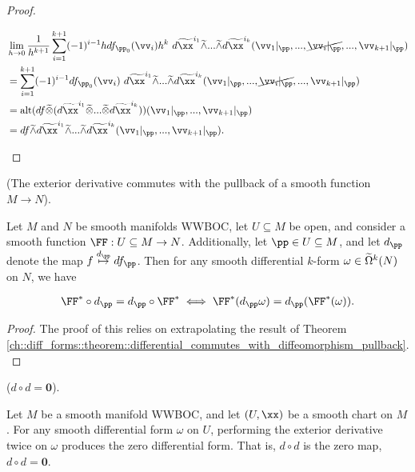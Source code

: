 \begin{proof}
\begin{enumerate}
        \begin{align*}
            &\lim_{h \rightarrow 0} \frac{1}{h^{k + 1}} \sum_{i = 1}^{k + 1} (-1)^{i - 1} h df_{\pp_0}(\vv_i) h^k \spc d\tx^{i_1} \twedge ... \twedge d\tx^{i_k}(\vv_1|_\pp, ..., \cancel{\vv_i|_\pp}, ..., \vv_{k + 1}|_\pp) \\
            &= \sum_{i = 1}^{k + 1} (-1)^{i - 1} df_{\pp_0}(\vv_i) \spc d\tx^{i_1} \twedge ... \twedge d\tx^{i_k}(\vv_1|_\pp, ..., \cancel{\vv_i|_\pp}, ..., \vv_{k + 1}|_\pp) \\
            &= \alt(df \totimes (d\tx^{i_1} \totimes ... \totimes d\tx^{i_k}))(\vv_1|_\pp, ..., \vv_{k + 1}|_\pp) \\
            &= df \twedge d\tx^{i_1} \twedge ... \twedge d\tx^{i_k}(\vv_1|_\pp, ..., \vv_{k + 1}|_\pp).
        \end{align*}
    \end{enumerate}
\end{proof}

\begin{theorem}
    \label{ch::exterior_pwrs::thm::exterior_derivative_commutes_with_pullback}
     (The exterior derivative commutes with the pullback of a smooth function $M \rightarrow N$).
    
    Let $M$ and $N$ be smooth manifolds WWBOC, let $U \subseteq M$ be open, and consider a smooth function $\FF:U \subseteq M \rightarrow N$. Additionally, let $\pp \in U \subseteq M$, and let $d_\pp$ denote the map $f \overset{d_\pp}{\mapsto} df_\pp$. Then for any smooth differential $k$-form $\omega \in \widetilde{\Omega}^k(N)$ on $N$, we have
    
    \begin{align*}
        \FF^* \circ d_\pp = d_\pp \circ \FF^* \iff \FF^*(d_\pp \omega) = d_\pp ( \FF^*(\omega) ).
    \end{align*}
\end{theorem}

\begin{proof}
    The proof of this relies on extrapolating the result of Theorem \ref{ch::diff_forms::theorem::differential_commutes_with_diffeomorphism_pullback}.
\end{proof}

\begin{theorem}
     ($d \circ d = \mathbf{0}$).
    
    Let $M$ be a smooth manifold WWBOC, and let $(U, \xx)$ be a smooth chart on $M$. For any smooth differential form $\omega$ on $U$, performing the exterior derivative twice on $\omega$ produces the zero differential form. That is, $d \circ d$ is the zero map, $d \circ d = \mathbf{0}$.
\end{theorem}

